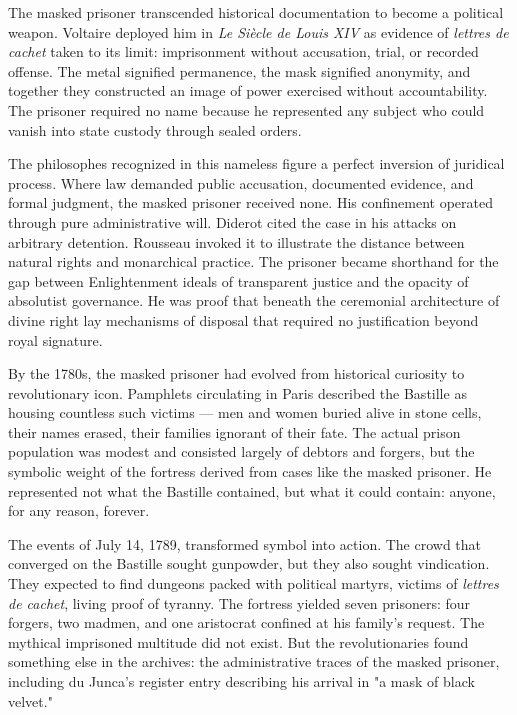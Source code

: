 The masked prisoner transcended historical documentation to become a political weapon. Voltaire deployed him in \textit{Le Siècle de Louis XIV} as evidence of \textit{lettres de cachet} taken to its limit: imprisonment without accusation, trial, or recorded offense. The metal signified permanence, the mask signified anonymity, and together they constructed an image of power exercised without accountability. The prisoner required no name because he represented any subject who could vanish into state custody through sealed orders.

The philosophes recognized in this nameless figure a perfect inversion of juridical process. Where law demanded public accusation, documented evidence, and formal judgment, the masked prisoner received none. His confinement operated through pure administrative will. Diderot cited the case in his attacks on arbitrary detention. Rousseau invoked it to illustrate the distance between natural rights and monarchical practice. The prisoner became shorthand for the gap between Enlightenment ideals of transparent justice and the opacity of absolutist governance. He was proof that beneath the ceremonial architecture of divine right lay mechanisms of disposal that required no justification beyond royal signature.

By the 1780s, the masked prisoner had evolved from historical curiosity to revolutionary icon. Pamphlets circulating in Paris described the Bastille as housing countless such victims — men and women buried alive in stone cells, their names erased, their families ignorant of their fate. The actual prison population was modest and consisted largely of debtors and forgers, but the symbolic weight of the fortress derived from cases like the masked prisoner. He represented not what the Bastille contained, but what it could contain: anyone, for any reason, forever.

The events of July 14, 1789, transformed symbol into action. The crowd that converged on the Bastille sought gunpowder, but they also sought vindication. They expected to find dungeons packed with political martyrs, victims of \textit{lettres de cachet}, living proof of tyranny. The fortress yielded seven prisoners: four forgers, two madmen, and one aristocrat confined at his family's request. The mythical imprisoned multitude did not exist. But the revolutionaries found something else in the archives: the administrative traces of the masked prisoner, including du Junca's register entry describing his arrival in "a mask of black velvet."


